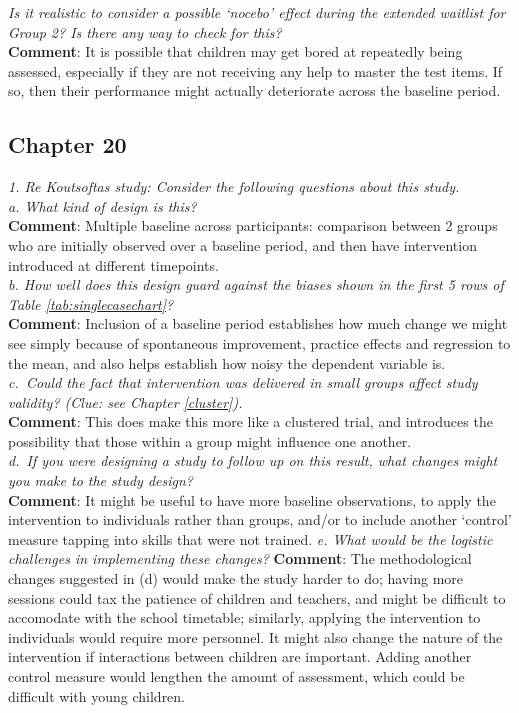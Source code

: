 \documentclass{krantz}
\begin{document}
\emph{Is it realistic to consider a possible `nocebo' effect during the extended waitlist for Group 2? Is there any way to check for this?}\\
\textbf{Comment}: It is possible that children may get bored at repeatedly being assessed, especially if they are not receiving any help to master the test items. If so, then their performance might actually deteriorate across the baseline period.

\hypertarget{chapter-20}{%
\subsection{Chapter 20}\label{chapter-20}}

\emph{1. Re Koutsoftas study: Consider the following questions about this study.}\\
\emph{a. What kind of design is this?}\\
\textbf{Comment}: Multiple baseline across participants: comparison between 2 groups who are initially observed over a baseline period, and then have intervention introduced at different timepoints.\\
\emph{b. How well does this design guard against the biases shown in the first 5 rows of Table \ref{tab:singlecasechart}?}\\
\textbf{Comment}: Inclusion of a baseline period establishes how much change we might see simply because of spontaneous improvement, practice effects and regression to the mean, and also helps establish how noisy the dependent variable is.\\
\emph{c.~Could the fact that intervention was delivered in small groups affect study validity? (Clue: see Chapter \ref{cluster}).}\\
\textbf{Comment}: This does make this more like a clustered trial, and introduces the possibility that those within a group might influence one another.\\
\emph{d.~If you were designing a study to follow up on this result, what changes might you make to the study design?}\\
\textbf{Comment}: It might be useful to have more baseline observations, to apply the intervention to individuals rather than groups, and/or to include another `control' measure tapping into skills that were not trained.
\emph{e. What would be the logistic challenges in implementing these changes?}
\textbf{Comment}: The methodological changes suggested in (d) would make the study harder to do; having more sessions could tax the patience of children and teachers, and might be difficult to accomodate with the school timetable; similarly, applying the intervention to individuals would require more personnel. It might also change the nature of the intervention if interactions between children are important. Adding another control measure would lengthen the amount of assessment, which could be difficult with young children.
\end{document}
